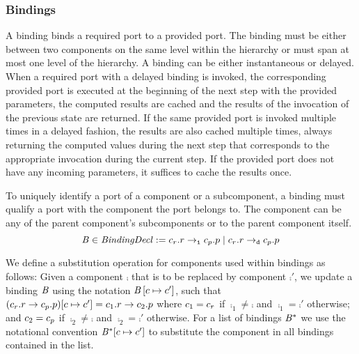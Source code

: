 \documentclass[a4paper,10pt,english]{article}
\begin{document}
\subsubsection{Bindings}
A binding binds a required port to a provided port. The binding must be either between two components on the
same level within the hierarchy or must span at most one level of the hierarchy. A binding can be either
instantaneous or delayed. When a required port with a delayed binding is invoked, the corresponding provided port is executed
at the beginning of the next step with the provided parameters, the computed results are cached and the results of the invocation
of the previous state are returned. If the same provided port is invoked multiple times in a delayed fashion, the results are also
cached multiple times, always returning the computed values during the next step that corresponds to the appropriate invocation
during the current step. If the provided port does not have any incoming parameters, it suffices to cache the results once.

To uniquely identify a port of a component or a subcomponent, a binding must qualify a port with the component the port belongs
to. The component can be any of the parent component's subcomponents or to the parent component itself.
\begin{equation*} 
	\mathit{B} \in \mathit{BindingDecl} :=
		c_r\mathtt{.}r \; \mathtt{\rightarrow_i} \; c_p\mathtt{.}p
		\mid
		c_r\mathtt{.}r \; \mathtt{\rightarrow_d} \; c_p\mathtt{.}p
\end{equation*}

We define a substitution operation for components used within bindings as follows: Given a component $\comp$ that is to be
replaced by component $\comp'$, we update a binding $\mathit{B}$ using the notation $\mathit{B}\left[c \mapsto
c'\right]$, such that
$(c_r\mathtt{.}r \; \mathtt{\rightarrow} \; c_p\mathtt{.}p)[c
\mapsto c'] = c_1\mathtt{.}r \; \mathtt{\rightarrow} \; c_2\mathtt{.}p$ where
$c_1 = c_r$ if $\comp_1 \neq \comp$ and $\comp_1 = \comp'$ otherwise; and $c_2 = c_p$ if $\comp_2
\neq \comp$ and $\comp_2 = \comp'$ otherwise.
For a list of bindings $\mathit{B}^*$ we use the notational convention
$\mathit{B}^*[c \mapsto c']$ to substitute the component in all bindings contained in the list.
\end{document}
